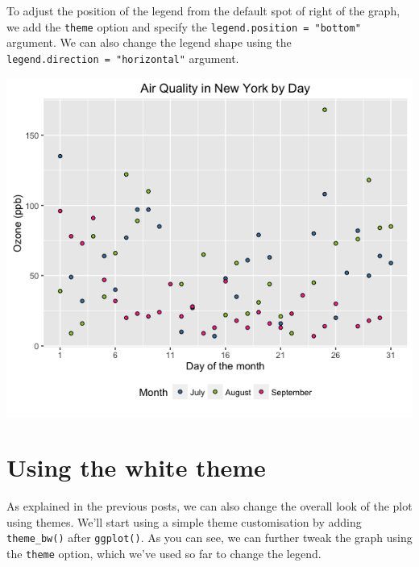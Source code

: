 To adjust the position of the legend from the default spot of right of
the graph, we add the \texttt{theme} option and specify the
\texttt{legend.position\ =\ "bottom"} argument. We can also change the
legend shape using the \texttt{legend.direction\ =\ "horizontal"}
argument.

\begin{Shaded}
\begin{Highlighting}[]
\StringTok{ }\StringTok{ }\NormalTok{(} \NormalTok{, } \NormalTok{)}
\end{Highlighting}
\end{Shaded}

\begin{center}\includegraphics[width=0.55\linewidth]{0_all_posts_pdf/scatter_11-1} \end{center}

\section{Using the white theme}\label{using-the-white-theme-4}

As explained in the previous posts, we can also change the overall look
of the plot using themes. We'll start using a simple theme customisation
by adding \texttt{theme\_bw()} after \texttt{ggplot()}. As you can see,
we can further tweak the graph using the \texttt{theme} option, which
we've used so far to change the legend.


